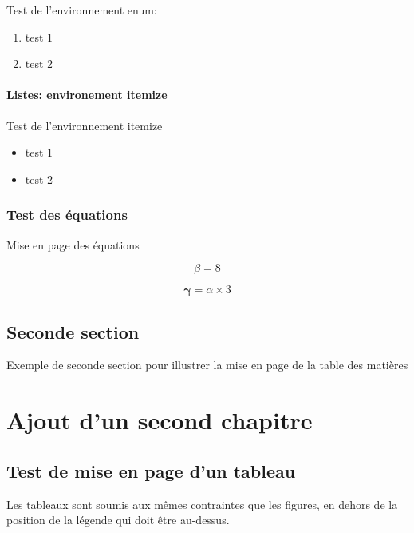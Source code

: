 \documentclass[a4paper, oneside, 12pt, memoireMaitrise, francais, creativecommons, hyperref]{memoESPA}
\begin{document}
Test de l'environnement enum:
\begin{enumerate}
 \item test 1
 \item test 2
\end{enumerate}

\subsubsection{Listes: environement itemize}

Test de l'environnement itemize
\begin{itemize}
 \item test 1
 \item test 2
\end{itemize}

\subsection{Test des équations}

Mise en page des équations

\begin{equation}
   \beta = 8
\end{equation}

\begin{equation}
   \bm{\gamma} = \alpha \times 3
\end{equation}

\section{Seconde section}

Exemple de seconde section pour illustrer la mise en page de la table des matières


\chapter{Ajout d'un second chapitre}

\section{Test de mise en page d'un tableau}

Les tableaux sont soumis aux mêmes contraintes que les figures, en dehors de la position de la légende qui doit être au-dessus.
\end{document}
